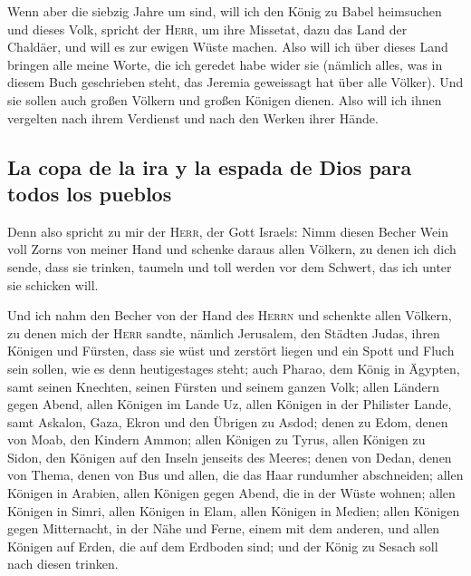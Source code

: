  Wenn aber die siebzig Jahre um sind, will ich den König
zu Babel heimsuchen und dieses Volk, spricht der \textsc{Herr}, um ihre
Missetat, dazu das Land der Chaldäer, und will es zur ewigen Wüste
machen.  Also will ich über dieses Land bringen alle
meine Worte, die ich geredet habe wider sie (nämlich alles, was in
diesem Buch geschrieben steht, das Jeremia geweissagt hat über alle
Völker).  Und sie sollen auch großen Völkern und großen
Königen dienen. Also will ich ihnen vergelten nach ihrem Verdienst und
nach den Werken ihrer Hände.

\hypertarget{la-copa-de-la-ira-y-la-espada-de-dios-para-todos-los-pueblos}{%
\subsection{La copa de la ira y la espada de Dios para todos los
pueblos}\label{la-copa-de-la-ira-y-la-espada-de-dios-para-todos-los-pueblos}}

 Denn also spricht zu mir der \textsc{Herr}, der Gott
Israels: Nimm diesen Becher Wein voll Zorns von meiner Hand und schenke
daraus allen Völkern, zu denen ich dich sende,  dass sie
trinken, taumeln und toll werden vor dem Schwert, das ich unter sie
schicken will.

 Und ich nahm den Becher von der Hand des \textsc{Herrn}
und schenkte allen Völkern, zu denen mich der \textsc{Herr} sandte,
 nämlich Jerusalem, den Städten Judas, ihren Königen und
Fürsten, dass sie wüst und zerstört liegen und ein Spott und Fluch sein
sollen, wie es denn heutigestages steht;  auch Pharao,
dem König in Ägypten, samt seinen Knechten, seinen Fürsten und seinem
ganzen Volk;  allen Ländern gegen Abend, allen Königen im
Lande Uz, allen Königen in der Philister Lande, samt Askalon, Gaza,
Ekron und den Übrigen zu Asdod;  denen zu Edom, denen von
Moab, den Kindern Ammon;  allen Königen zu Tyrus, allen
Königen zu Sidon, den Königen auf den Inseln jenseits des Meeres;
 denen von Dedan, denen von Thema, denen von Bus und
allen, die das Haar rundumher abschneiden;  allen Königen
in Arabien, allen Königen gegen Abend, die in der Wüste wohnen;
 allen Königen in Simri, allen Königen in Elam, allen
Königen in Medien;  allen Königen gegen Mitternacht, in
der Nähe und Ferne, einem mit dem anderen, und allen Königen auf Erden,
die auf dem Erdboden sind; und der König zu Sesach soll nach diesen
trinken.

